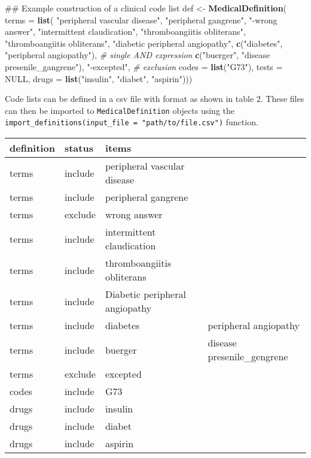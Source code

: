 \documentclass[]{article}
\newenvironment{Shaded}{\begin{snugshade}}{\end{snugshade}}
\newcommand{\KeywordTok}[1]{\textcolor[rgb]{0.13,0.29,0.53}{\textbf{{#1}}}}
\newcommand{\DataTypeTok}[1]{\textcolor[rgb]{0.13,0.29,0.53}{{#1}}}
\newcommand{\StringTok}[1]{\textcolor[rgb]{0.31,0.60,0.02}{{#1}}}
\newcommand{\CommentTok}[1]{\textcolor[rgb]{0.56,0.35,0.01}{\textit{{#1}}}}
\newcommand{\OtherTok}[1]{\textcolor[rgb]{0.56,0.35,0.01}{{#1}}}
\newcommand{\NormalTok}[1]{{#1}}
\begin{document}
\begin{Shaded}
\begin{Highlighting}[]
\NormalTok{## Example construction of a clinical code list}
\NormalTok{def <-}\StringTok{ }\KeywordTok{MedicalDefinition}\NormalTok{(}
    \DataTypeTok{terms =} \KeywordTok{list}\NormalTok{(}
        \StringTok{"peripheral vascular disease"}\NormalTok{, }\StringTok{"peripheral gangrene"}\NormalTok{, }\StringTok{"-wrong answer"}\NormalTok{,}
        \StringTok{"intermittent claudication"}\NormalTok{, }\StringTok{"thromboangiitis obliterans"}\NormalTok{,}
        \StringTok{"thromboangiitis obliterans"}\NormalTok{, }\StringTok{"diabetic peripheral angiopathy"}\NormalTok{,}
        \KeywordTok{c}\NormalTok{(}\StringTok{"diabetes"}\NormalTok{, }\StringTok{"peripheral angiopathy"}\NormalTok{),  }\CommentTok{# single AND expression}
        \KeywordTok{c}\NormalTok{(}\StringTok{"buerger"}\NormalTok{,  }\StringTok{"disease presenile_gangrene"}\NormalTok{),}
            \StringTok{"-excepted"}\NormalTok{, }\CommentTok{# exclusion}
    \DataTypeTok{codes =} \KeywordTok{list}\NormalTok{(}\StringTok{"G73"}\NormalTok{),}
    \DataTypeTok{tests =} \OtherTok{NULL}\NormalTok{,}
    \DataTypeTok{drugs =} \KeywordTok{list}\NormalTok{(}\StringTok{"insulin"}\NormalTok{, }\StringTok{"diabet"}\NormalTok{, }\StringTok{"aspirin"}\NormalTok{)))}
\end{Highlighting}
\end{Shaded}

Code lists can be defined in a csv file with format as shown in table 2.
These files can then be imported to \texttt{MedicalDefinition} objects
using the \texttt{import\_definitions(input\_file = "path/to/file.csv")}
function.

\begin{longtable}[c]{@{}llll@{}}
\toprule
definition & status & items &\tabularnewline
\midrule
\endhead
terms & include & peripheral vascular disease &\tabularnewline
terms & include & peripheral gangrene &\tabularnewline
terms & exclude & wrong answer &\tabularnewline
terms & include & intermittent claudication &\tabularnewline
terms & include & thromboangiitis obliterans &\tabularnewline
terms & include & Diabetic peripheral angiopathy &\tabularnewline
terms & include & diabetes & peripheral angiopathy\tabularnewline
terms & include & buerger & disease presenile\_gengrene\tabularnewline
terms & exclude & excepted &\tabularnewline
codes & include & G73 &\tabularnewline
drugs & include & insulin &\tabularnewline
drugs & include & diabet &\tabularnewline
drugs & include & aspirin &\tabularnewline
\bottomrule
\end{longtable}
\end{document}

